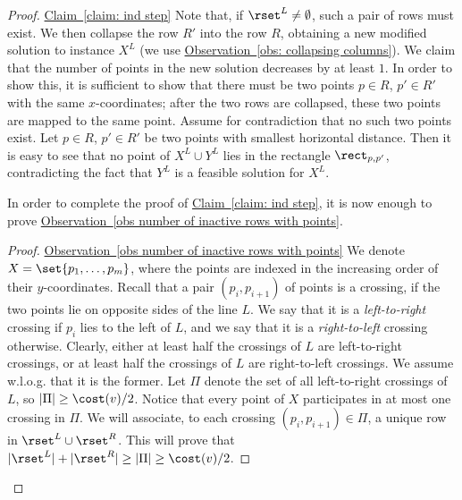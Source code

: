 \documentclass[11pt]{article}
\numberwithin{equation}{section}
\theoremstyle{definition}
\theoremstyle{plain}
\newcommand{\expref}[2]{\hyperref[#2]{#1~\ref{#2}}}
\begin{document}
\begin{proof}{\expref{Claim}{claim: ind step}}
Note that, if $\rset^L\neq\emptyset$, such a pair of rows must exist. We then collapse the row $R'$ into the row $R$, obtaining a new modified solution to instance $X^L$ (we use \expref{Observation}{obs: collapsing columns}). We claim that the number of points in the new solution decreases by at least $1$. In order to show this, it is sufficient to show that there must be two points $p\in R$, $p'\in R'$ with the same $x$-coordinates; after the two rows are collapsed, these two points are mapped to the same point. Assume for contradiction that no such two points exist. Let $p\in R$, $p'\in R'$ be two points with smallest horizontal distance. Then it is easy to see that no point of $X^L\cup Y^L$ lies in the rectangle $\rect_{p,p'}$, contradicting the fact that $Y^L$ is a feasible solution for $X^L$.

In order to complete the proof of \expref{Claim}{claim: ind step}, it is now enough to prove \expref{Observation}{obs number of inactive rows with points}.

\begin{proof}{\expref{Observation}{obs number of inactive rows with points}}
We denote $X=\set{p_1,\ldots,p_m}$, where the points are indexed in the increasing order of their $y$-coordinates. Recall that a pair $(p_i,p_{i+1})$ of points is a crossing, if the two points lie on opposite sides of the line $L$. We say that it is a \emph{left-to-right} crossing if $p_i$ lies to the left of $L$, and we say that it is a \emph{right-to-left} crossing otherwise. Clearly, either at least half the crossings of $L$ are left-to-right crossings, or at least half the crossings of $L$ are right-to-left crossings. We assume w.l.o.g. that it is the former. Let $\Pi$ denote the set of all left-to-right crossings of $L$, so $|\Pi|\geq \cost(v)/2$. Notice that every point of $X$ participates in at most one crossing in $\Pi$. We will associate, to each crossing $(p_i,p_{i+1})\in \Pi$, a unique row in $\rset^L\cup \rset^R$. This will prove that $|\rset^L|+|\rset^R|\geq |\Pi|\geq \cost(v)/2$.


\end{proof}
\end{proof}
\end{document}
